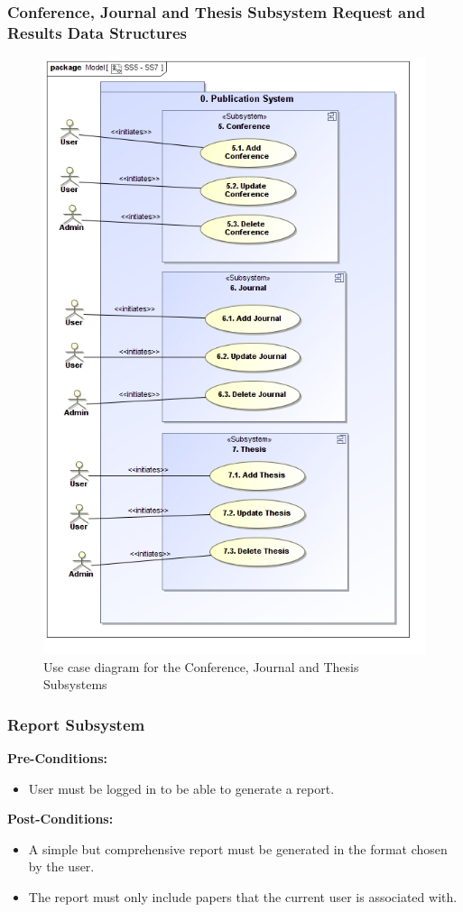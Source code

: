 \documentclass{article}
\begin{document}
		\subsubsection{Conference, Journal and Thesis Subsystem Request and Results Data Structures}
			\begin{figure}
				\includegraphics[width=\textwidth]{SS5-SS7}
				\caption{Use case diagram for the Conference, Journal and Thesis Subsystems}
			\end{figure}
		\subsubsection{Report Subsystem}
			\textbf{Pre-Conditions:}
			\begin{itemize}
				\item User must be logged in to be able to generate a report.
			\end{itemize}
				\textbf{Post-Conditions:}
			\begin{itemize}
				\item A simple but comprehensive report must be generated in the format chosen by the user.
				\item The report must only include papers that the current user is associated with.
			\end{itemize}
\end{document}
